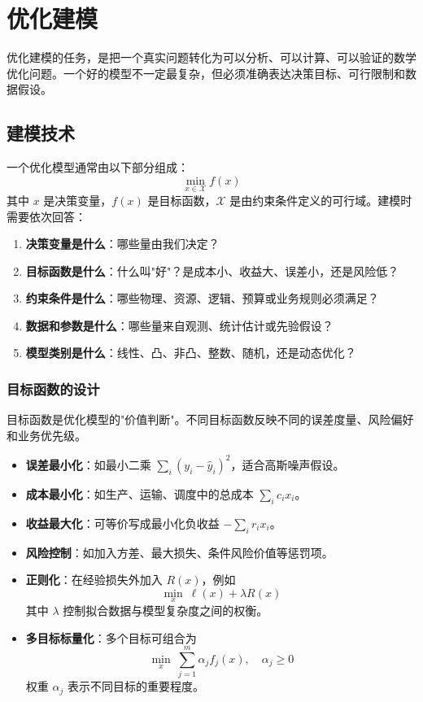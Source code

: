 \section{优化建模}\label{sec:optimization-modeling}

优化建模的任务，是把一个真实问题转化为可以分析、可以计算、可以验证的数学优化问题。一个好的模型不一定最复杂，但必须准确表达决策目标、可行限制和数据假设。

\subsection{建模技术}

\begin{conceptbox}[优化建模的基本结构]
一个优化模型通常由以下部分组成：
\[
\min_{x \in \mathcal{X}} f(x)
\]
其中 $x$ 是决策变量，$f(x)$ 是目标函数，$\mathcal{X}$ 是由约束条件定义的可行域。建模时需要依次回答：
\begin{enumerate}[label=(\arabic*), itemsep=0.3em]
    \item \textbf{决策变量是什么}：哪些量由我们决定？
    \item \textbf{目标函数是什么}：什么叫"好"？是成本小、收益大、误差小，还是风险低？
    \item \textbf{约束条件是什么}：哪些物理、资源、逻辑、预算或业务规则必须满足？
    \item \textbf{数据和参数是什么}：哪些量来自观测、统计估计或先验假设？
    \item \textbf{模型类别是什么}：线性、凸、非凸、整数、随机，还是动态优化？
\end{enumerate}
\end{conceptbox}

\subsubsection{目标函数的设计}

目标函数是优化模型的"价值判断"。不同目标函数反映不同的误差度量、风险偏好和业务优先级。

\begin{notebox}[常见目标函数设计方式]
\begin{itemize}[itemsep=0.3em]
    \item \textbf{误差最小化}：如最小二乘 $\sum_i (y_i-\hat y_i)^2$，适合高斯噪声假设。
    \item \textbf{成本最小化}：如生产、运输、调度中的总成本 $\sum_i c_i x_i$。
    \item \textbf{收益最大化}：可等价写成最小化负收益 $-\sum_i r_i x_i$。
    \item \textbf{风险控制}：如加入方差、最大损失、条件风险价值等惩罚项。
    \item \textbf{正则化}：在经验损失外加入 $R(x)$，例如
    \[
    \min_x\ \ell(x) + \lambda R(x)
    \]
    其中 $\lambda$ 控制拟合数据与模型复杂度之间的权衡。
    \item \textbf{多目标标量化}：多个目标可组合为
    \[
    \min_x\ \sum_{j=1}^{m} \alpha_j f_j(x),\quad \alpha_j \geq 0
    \]
    权重 $\alpha_j$ 表示不同目标的重要程度。
\end{itemize}
\end{notebox}

